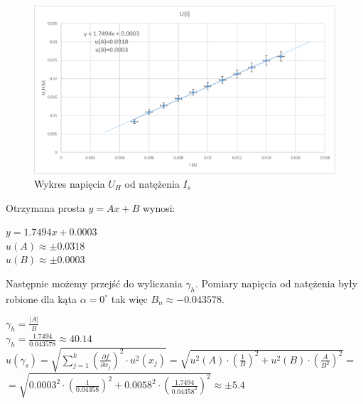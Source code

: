 \documentclass{article}
\begin{document}
\begin{figure}[h!]
    \centering
    \includegraphics{U_H_od_I.png}
    \caption{Wykres napięcia $U_{H}$ od natężenia $I_{s}$}
    \label{fig:rys4}
\end{figure}


\newpage

Otrzymana prosta $y=Ax+B$ wynosi:\\
\begin{center}
    $y=1.7494x+0.0003$\\
    $u(A)\approx\pm0.0318$\\
    $u(B)\approx\pm0.0003$\\
\end{center}
Następnie możemy przejść do wyliczania $\gamma_{h}$. Pomiary napięcia od natężenia były robione dla kąta $\alpha=0^{\circ}$ tak więc $B_{n}\approx-0.043578$.\\
\begin{flushleft}
    $\gamma_{h}=\frac{|A|}{B}$\\
    \vspace{2.5ex}
    $\gamma_{h}=\frac{1.7494}{0.043578}\approx 40.14$\\
    \vspace{2.5ex}
    $u(\gamma_{s})=\sqrt{\sum^{k}_{j=1}\left(\frac{\partial f}{\partial x_{j}}\right)^{2}\cdot u^{2}(x_{j})}=\sqrt{u^{2}(A)\cdot\left(\frac{1}{B}\right)^{2}+u^{2}(B)\cdot(\frac{A}{B^{2}})^{2}}=$\\
    \vspace{2.5ex}
    $=\sqrt{0.0003^{2}\cdot\left(\frac{1}{0.04358}\right)^{2}+0.0058^{2}\cdot(\frac{1.7494}{0.04358^{2}})^{2}}  \approx\pm5.4$\\
\end{flushleft}{}
\end{document}

